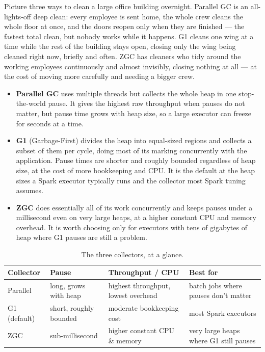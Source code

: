 \begin{analogy}
Picture three ways to clean a large office building overnight. Parallel GC is
an all-lights-off deep clean: every employee is sent home, the whole crew
cleans the whole floor at once, and the doors reopen only when they are
finished --- the fastest total clean, but nobody works while it happens. G1
cleans one wing at a time while the rest of the building stays open, closing
only the wing being cleaned right now, briefly and often. ZGC has cleaners who
tidy around the working employees continuously and almost invisibly, closing
nothing at all --- at the cost of moving more carefully and needing a bigger
crew.
\end{analogy}

\begin{itemize}
  \item \textbf{Parallel GC} uses multiple threads but collects the whole heap in
        one stop-the-world pause. It gives the highest raw throughput when pauses
        do not matter, but pause time grows with heap size, so a large executor
        can freeze for seconds at a time.
  \item \textbf{G1} (Garbage-First) divides the heap into equal-sized regions and
        collects a subset of them per cycle, doing most of its marking
        concurrently with the application. Pause times are shorter and roughly
        bounded regardless of heap size, at the cost of more bookkeeping and CPU.
        It is the default at the heap sizes a Spark executor typically runs and
        the collector most Spark tuning assumes.
  \item \textbf{ZGC} does essentially all of its work concurrently and keeps
        pauses under a millisecond even on very large heaps, at a higher constant
        CPU and memory overhead. It is worth choosing only for executors with
        tens of gigabytes of heap where G1 pauses are still a problem.
\end{itemize}

\begin{table}[H]
\centering\footnotesize
\renewcommand{\arraystretch}{1.25}
\begin{tabular}{@{}P{1.8cm}P{3.4cm}P{3.6cm}P{5cm}@{}}
\toprule
\textbf{Collector} & \textbf{Pause} & \textbf{Throughput / CPU} & \textbf{Best for} \\
\midrule
Parallel & long, grows with heap & highest throughput, lowest overhead & batch jobs where pauses don't matter \\
G1 (default) & short, roughly bounded & moderate bookkeeping cost & most Spark executors \\
ZGC & sub-millisecond & higher constant CPU \& memory & very large heaps where G1 still pauses \\
\bottomrule
\end{tabular}
\caption{The three collectors, at a glance.}
\label{tab:mem-collectors}
\end{table}

